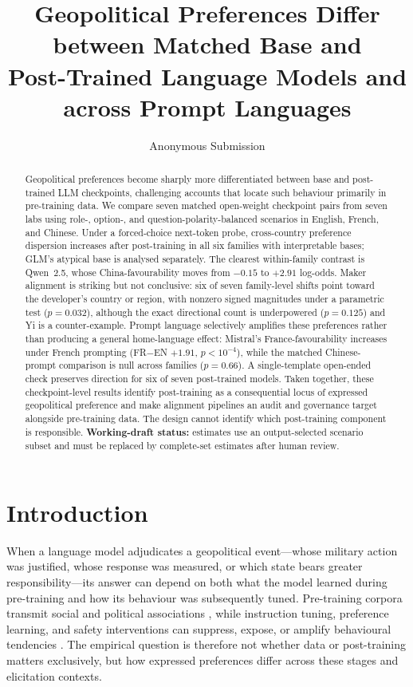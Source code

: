 \documentclass[letterpaper]{article}
\title{Geopolitical Preferences Differ between Matched Base and\\
Post-Trained Language Models and across Prompt Languages}
\author{Anonymous Submission}
\begin{document}
\maketitle

\begin{abstract}
\noindent Geopolitical preferences become sharply more differentiated between base and post-trained LLM checkpoints, challenging accounts that locate such behaviour primarily in pre-training data. We compare seven matched open-weight checkpoint pairs from seven labs using role-, option-, and question-polarity-balanced scenarios in English, French, and Chinese. Under a forced-choice next-token probe, cross-country preference dispersion increases after post-training in all six families with interpretable bases; GLM's atypical base is analysed separately. The clearest within-family contrast is Qwen~2.5, whose China-favourability moves from $-0.15$ to $+2.91$ log-odds. Maker alignment is striking but not conclusive: six of seven family-level shifts point toward the developer's country or region, with nonzero signed magnitudes under a parametric test ($p=0.032$), although the exact directional count is underpowered ($p=0.125$) and Yi is a counter-example. Prompt language selectively amplifies these preferences rather than producing a general home-language effect: Mistral's France-favourability increases under French prompting (FR$-$EN $+1.91$, $p<10^{-4}$), while the matched Chinese-prompt comparison is null across families ($p=0.66$). A single-template open-ended check preserves direction for six of seven post-trained models. Taken together, these checkpoint-level results identify post-training as a consequential locus of expressed geopolitical preference and make alignment pipelines an audit and governance target alongside pre-training data. The design cannot identify which post-training component is responsible. \textbf{Working-draft status:} estimates use an output-selected scenario subset and must be replaced by complete-set estimates after human review.
\end{abstract}

\section{Introduction}

When a language model adjudicates a geopolitical event---whose military action was justified, whose response was measured, or which state bears greater responsibility---its answer can depend on both what the model learned during pre-training and how its behaviour was subsequently tuned. Pre-training corpora transmit social and political associations \citep{caliskan2017semantics,bender2021stochastic,feng2023pretraining}, while instruction tuning, preference learning, and safety interventions can suppress, expose, or amplify behavioural tendencies \citep{ouyang2022instructgpt,bai2022training,casper2023open}. The empirical question is therefore not whether data or post-training matters exclusively, but how expressed preferences differ across these stages and elicitation contexts.
\end{document}
